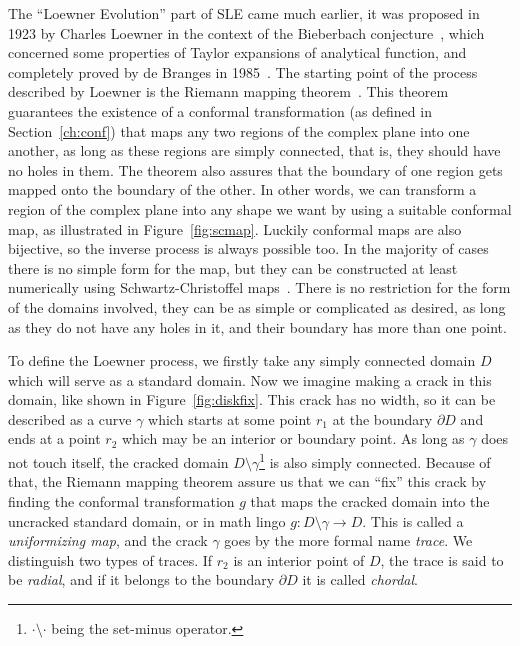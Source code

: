 The ``Loewner Evolution'' part of SLE came much earlier, it was proposed in
1923 by Charles Loewner in the context of the Bieberbach
conjecture~\cite{Loewner1923}, which concerned some properties of Taylor
expansions of analytical function, and completely proved by de Branges in
1985~\cite{DeBranges1985}. The starting point of the process described by
Loewner is the Riemann mapping theorem~\cite{Ahlfors1979}. This theorem
guarantees the existence of a conformal transformation (as defined in
Section~\ref{ch:conf}) that maps any two regions of the complex plane into one
another, as long as these regions are simply connected, that is, they should
have no holes in them. The theorem also assures that the boundary of one region
gets mapped onto the boundary of the other. In other words, we can transform a
region of the complex plane into any shape we want by using a suitable
conformal map, as illustrated in Figure~\ref{fig:scmap}. Luckily conformal maps
are also bijective, so the inverse process is always possible too. In the
majority of cases there is no simple form for the map, but they can be
constructed at least numerically using Schwartz-Christoffel
maps~\cite{Driscoll2002}. There is no restriction for the form of the domains
involved, they can be as simple or complicated as desired, as long as they do
not have any holes in it, and their boundary has more than one point.

To define the Loewner process, we firstly take any simply connected domain $D$
which will serve as a standard domain. Now we imagine making a crack in this
domain, like shown in Figure~\ref{fig:diskfix}. This crack has no width, so it
can be described as a curve $\gamma$ which starts at some point $r_1$ at the
boundary $\partial D$ and ends at a point $r_2$ which may be an interior or
boundary point. As long as $\gamma$ does not touch itself, the cracked domain
$D\setminus\gamma$\footnote{$\cdot\setminus\cdot$ being the set-minus
    operator.} is also simply connected. Because of that, the Riemann mapping
theorem assure us that we can ``fix'' this crack by finding the conformal
transformation $g$ that maps the cracked domain into the uncracked standard
domain, or in math lingo $g:D\setminus\gamma\rightarrow D$. This is called a
\textit{uniformizing map}, and the crack  $\gamma$ goes by the more formal name
\textit{trace}. We distinguish two types of traces. If $r_2$ is an interior
point of $D$, the trace is said to be \textit{radial}, and if it belongs to the
boundary $\partial D$ it is called \textit{chordal}.

